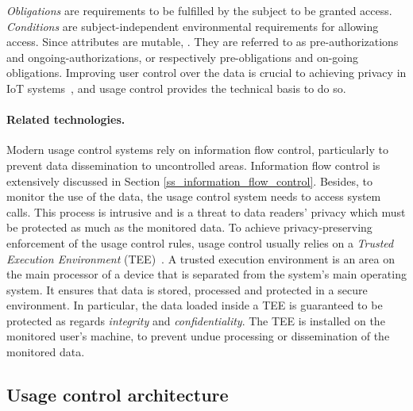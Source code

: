  \emph{Obligations} are requirements to be fulfilled by the subject to be granted access. \emph{Conditions} are subject-independent environmental requirements for allowing access. Since attributes are mutable, . They are referred to as pre-authorizations and ongoing-authorizations, or respectively pre-obligations and on-going obligations.
Improving user control over the data is crucial to achieving privacy in IoT systems~\cite{Cha2019}, and usage control provides the technical basis to do so.

\paragraph{Related technologies.} Modern usage control systems rely on information flow control, particularly to prevent data dissemination to uncontrolled areas. Information flow control is extensively discussed in Section \ref{ss_information_flow_control}. Besides, to monitor the use of the data, the usage control system needs to access system calls. This process is intrusive and is a threat to data readers' privacy which must be protected as much as the monitored data. 
To achieve privacy-preserving enforcement of the usage control rules, usage control usually relies on a \emph{Trusted Execution Environment} (TEE)~\cite{Shi2021}. A trusted execution environment is an area on the main processor of a device that is separated from the system's main operating system. It ensures that data is stored, processed and protected in a secure environment. In particular, the data loaded inside a TEE is guaranteed to be protected as regards \emph{integrity} and \emph{confidentiality}. The TEE is installed on the monitored user's machine, to prevent undue processing or dissemination of the monitored data.


\subsection{Usage control architecture}
\label{ss_ucon_architecture}


